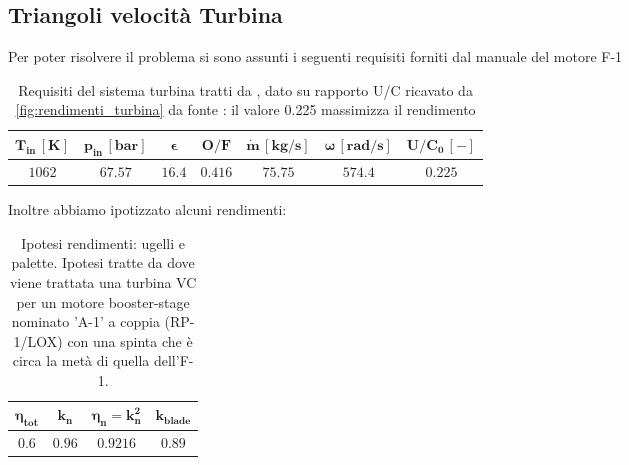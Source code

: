 

\subsection{Triangoli velocità Turbina}
Per poter risolvere il problema si sono assunti i seguenti requisiti forniti dal manuale del motore F-1 \cite{engine_manual}
\begin{table}[H]

\centering
\begin{tabular}{|c|c|c|c|c|c|c|}
\hline
$\bm{T_{in} \, [K]}$ & $\bm{p_{in} \, [bar]}$ & $\bm{\epsilon}$ &  $\bm{O/F}$ & $\bm{\dot{m} \, [kg/s]}$ & $\bm{\omega \, [rad/s]}$ & $\bm{U/C_0 \, [-]}$ \\
\hline
$1062$ & $67.57$ & $16.4$ &  $0.416$ & $75.75$ & $574.4$ & $0.225$ \\
\hline
\end{tabular}

\caption{Requisiti del sistema turbina tratti da \cite{engine_manual}, dato su rapporto U/C ricavato da \autoref{fig:rendimenti_turbina} da fonte \cite{AIAA_book_2}: il valore 0.225 massimizza il rendimento}
\label{table:turbine}

\end{table}

Inoltre abbiamo ipotizzato alcuni rendimenti:

\begin{table}[H]

\centering
\begin{tabular}{|c|c|c|c|}
\hline
$\bm{\eta_{tot}}$ & $\bm{k_n}$ & $\bm{\eta_n = k_n ^2}$ &  $\bm{k_{blade}}$   \\
\hline
$0.6$ & $0.96$ & $0.9216$ &  $0.89$ \\
\hline
\end{tabular}

\caption{Ipotesi rendimenti: ugelli e palette. Ipotesi tratte da \cite{AIAA_book_2} dove viene trattata una turbina VC per un motore booster-stage nominato 'A-1' a coppia (RP-1/LOX) con una spinta che è circa la metà di quella dell'F-1.}
\label{table:rendimenti turbina}
\end{table}

